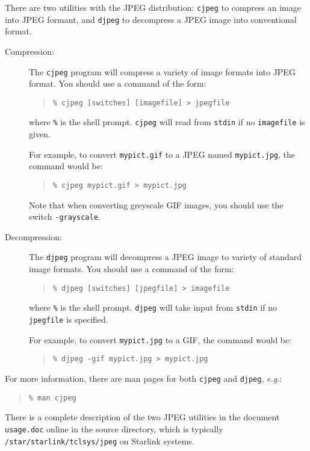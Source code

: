 There are two utilities with the JPEG distribution: {\tt{cjpeg}} to compress
an image into JPEG formant, and {\tt{djpeg}} to decompress a JPEG image into
conventional format.

\begin{description}

\item[Compression:]  The {\tt{cjpeg}} program will compress a variety of
image formats into JPEG format.  You should use a command of the form:

\begin{quote}
{\tt \% cjpeg [switches] [imagefile] > jpegfile}
\end{quote}

where {\tt{\%}} is the shell prompt.  {\tt{cjpeg}} will read from {\tt{stdin}}
if no {\tt{imagefile}} is given.

For example, to convert {\tt{mypict.gif}}
to a JPEG named {\tt{mypict.jpg}}, the command would be:

\begin{quote}
{\tt \% cjpeg mypict.gif > mypict.jpg}
\end{quote}

Note that when converting greyscale GIF images, you should use the switch
{\tt{-grayscale}}.

\item[Decompression:] The {\tt{djpeg}} program will decompress a JPEG image
to variety of standard image formats.  You should use a command of the form:

\begin{quote}
{\tt \% djpeg [switches] [jpegfile] > imagefile}
\end{quote}

where {\tt{\%}} is the shell prompt.  {\tt{djpeg}} will take input from
{\tt{stdin}} if no {\tt{jpegfile}} is specified.

For example, to convert {\tt{mypict.jpg}} to a GIF, the command would be:

\begin{quote}
{\tt \% djpeg -gif mypict.jpg > mypict.jpg}
\end{quote}

\end{description}

For more information, there are man pages for both {\tt{cjpeg}} and
{\tt{djpeg}}, {\em{e.g.}}:

\begin{quote}
{\tt \% man cjpeg}
\end{quote}

There is a complete description of the two JPEG utilities in the document
{\tt{usage.doc}} online in the source directory, which is typically
{\tt{/star/starlink/tclsys/jpeg}} on Starlink systems.


